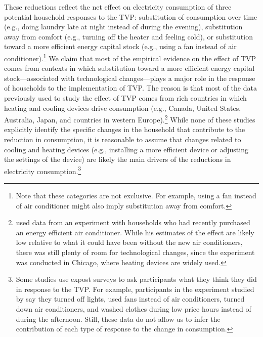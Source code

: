 \documentclass[12pt]{article}
\begin{document}
These reductions reflect the net effect on electricity consumption of three potential household responses to the TVP: substitution of consumption over time (e.g., doing laundry late at night instead of during the evening), substitution away from comfort (e.g., turning off the heater and feeling cold), or substitution toward a more efficient energy capital stock (e.g., using a fan instead of air conditioner).\footnote{Note that these categories are not exclusive. For example, using a fan instead of air conditioner might also imply substitution away from comfort.} We claim that most of the empirical evidence on the effect of TVP comes from contexts in which substitution toward a more efficient energy capital stock---associated with technological changes---plays a major role in the response of households to the implementation of TVP. The reason is that most of the data previously used to study the effect of TVP comes from rich countries in which heating and cooling devices drive consumption (e.g., Canada, United States, Australia, Japan, and countries in western Europe).\footnote{\citet{allcottRethinkingRealtimeElectricity2011} used data from an experiment with households who had recently purchased an energy efficient air conditioner. While his estimates of the effect are likely low relative to what it could have been without the new air conditioners, there was still plenty of room for technological changes, since the experiment was conducted in Chicago, where heating devices are widely used.}  While none of these studies explicitly identify the specific changes in the household that contribute to the reduction in consumption, it is reasonable to assume that changes related to cooling and heating devices (e.g., installing a more efficient device or adjusting the settings of the device) are likely the main drivers of the reductions in electricity consumption.\footnote{Some studies use expost surveys to ask participants what they think they did in response to the TVP. For example, participants in the experiment studied by \citet{allcottRethinkingRealtimeElectricity2011} say they turned off lights, used fans instead of air conditioners, turned down air conditioners, and washed clothes during low price hours instead of during the afternoon. Still, these data do not allow us to infer the contribution of each type of response to the change in consumption.}
\end{document}
